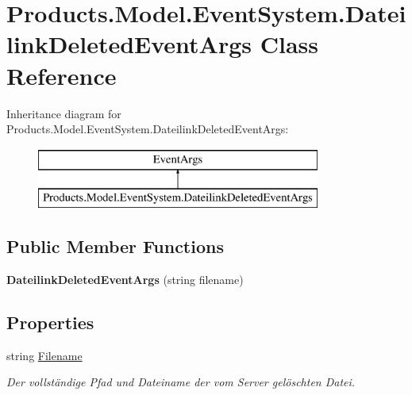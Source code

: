 \hypertarget{class_products_1_1_model_1_1_event_system_1_1_dateilink_deleted_event_args}{}\section{Products.\+Model.\+Event\+System.\+Dateilink\+Deleted\+Event\+Args Class Reference}
\label{class_products_1_1_model_1_1_event_system_1_1_dateilink_deleted_event_args}
Inheritance diagram for Products.\+Model.\+Event\+System.\+Dateilink\+Deleted\+Event\+Args\+:\begin{figure}[H]
\begin{center}
\leavevmode
\includegraphics[height=2.000000cm]{class_products_1_1_model_1_1_event_system_1_1_dateilink_deleted_event_args}
\end{center}
\end{figure}
\subsection*{Public Member Functions}
\begin{DoxyCompactItemize}
\item 
{\bfseries Dateilink\+Deleted\+Event\+Args} (string filename)\hypertarget{class_products_1_1_model_1_1_event_system_1_1_dateilink_deleted_event_args_ab703983ec87fc20054e37a49853baf08}{}\label{class_products_1_1_model_1_1_event_system_1_1_dateilink_deleted_event_args_ab703983ec87fc20054e37a49853baf08}

\end{DoxyCompactItemize}
\subsection*{Properties}
\begin{DoxyCompactItemize}
\item 
string \hyperlink{class_products_1_1_model_1_1_event_system_1_1_dateilink_deleted_event_args_ac261c213281ae3893e5728c1d2ebcb04}{Filename}
\begin{DoxyCompactList}\small\item\em Der vollständige Pfad und Dateiname der vom Server gelöschten Datei. \end{DoxyCompactList}\end{DoxyCompactItemize}



